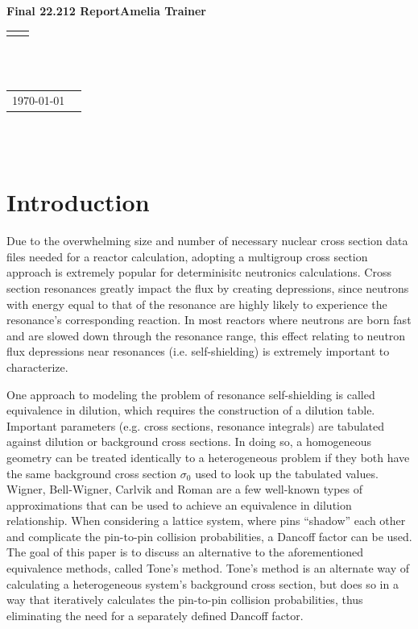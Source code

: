\documentclass[10pt]{article}
\renewcommand{\title}[1]{\textbf{#1}\\}
\renewcommand{\line}{\begin{tabularx}{\textwidth}{X>{\raggedleft}X}\hline\\\end{tabularx}\\[-0.5cm]}
\newcommand{\leftright}[2]{\begin{tabularx}{\textwidth}{X>{\raggedleft}X}#1%
\end{tabularx}\\[-0.5cm]}
\begin{document}
\title{Final 22.212 Report\qquad Amelia Trainer }
\line\\
\leftright{\today}{ }%
~\par

\section{Introduction}
Due to the overwhelming size and number of necessary nuclear cross section data files needed for a reactor calculation, adopting a multigroup cross section approach is extremely popular for determinisitc neutronics calculations. Cross section resonances greatly impact the flux by creating depressions, since neutrons with energy equal to that of the resonance are highly likely to experience the resonance's corresponding reaction. In most reactors where neutrons are born fast and are slowed down through the resonance range, this effect relating to neutron flux depressions near resonances (i.e. self-shielding) is extremely important to characterize.\par
One approach to modeling the problem of resonance self-shielding is called equivalence in dilution, which requires the construction of a dilution table. Important parameters (e.g. cross sections, resonance integrals) are tabulated against dilution or background cross sections. In doing so, a homogeneous geometry can be treated identically to a heterogeneous problem if they both have the same background cross section $\sigma_0$ used to look up the tabulated values. Wigner, Bell-Wigner, Carlvik and Roman are a few well-known types of approximations that can be used to achieve an equivalence in dilution relationship. When considering a lattice system, where pins ``shadow'' each other and complicate the pin-to-pin collision probabilities, a Dancoff factor can be used. The goal of this paper is to discuss an alternative to the aforementioned equivalence methods, called Tone's method. Tone's method is an alternate way of calculating a heterogeneous system's background cross section, but does so in a way that iteratively calculates the pin-to-pin collision probabilities, thus eliminating the need for a separately defined Dancoff factor. 
\end{document}
